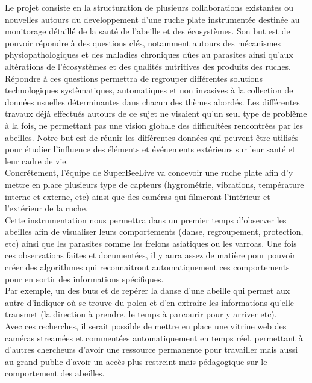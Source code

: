 \documentclass[11pt,french,a4paper]{report}
\begin{document}
Le projet consiste en la structuration de plusieurs collaborations existantes ou nouvelles autours du developpement 
d’une ruche plate instrumentée destinée au monitorage détaillé de la santé de l’abeille et des écosystèmes. Son but est de
pouvoir répondre à des questions clés, notamment autours des mécanismes physiopathologiques et des maladies chroniques 
dûes au parasites ainsi qu’aux altérations de l’écosystèmes et des qualités nutritives des produits des ruches. \\
Répondre à ces questions permettra de regrouper différentes solutions technologiques systèmatiques, 
automatiques et non invasives à la collection de données usuelles déterminantes dans chacun des thèmes abordés.
Les différentes travaux déjà effectués autours de ce sujet ne visaient qu’un seul type de problème à la fois, 
ne permettant pas une vision globale des difficultées rencontrées par les abeilles. Notre but est de réunir les différentes
données qui peuvent être utilisés pour étudier l’influence des éléments et événements extérieurs sur leur santé et leur cadre de vie.\\

Concrétement, l'équipe de SuperBeeLive va concevoir une ruche plate afin d'y mettre en place plusieurs type de capteurs
(hygrométrie, vibrations, température interne et externe, etc) ainsi que des caméras qui filmeront l'intérieur et 
l'extérieur de la ruche. \\


Cette instrumentation nous permettra dans un premier temps d'observer les abeilles afin de visualiser leurs comportements 
(danse, regroupement, protection, etc) ainsi que les parasites comme les frelons asiatiques ou les varroas. %
Une fois ces observations faites et documentées, il y aura assez de matière pour pouvoir créer des algorithmes qui reconnaitront 
automatiquement ces comportements pour en sortir des informations spécifiques.\\
Par exemple, un des buts et de repérer la danse d'une abeille qui permet aux autre d'indiquer où se trouve du polen et d'en
extraire les informations qu'elle transmet (la direction à prendre, le temps à parcourir pour y arriver etc).\\
Avec ces recherches, il serait possible de mettre en place une vitrine web des caméras streamées et commentées 
automatiquement en temps réel, permettant à d'autres chercheurs d'avoir une ressource permanente pour travailler mais aussi
au grand public d'avoir un accès plus restreint mais pédagogique sur le comportement des abeilles. \\
\end{document}
